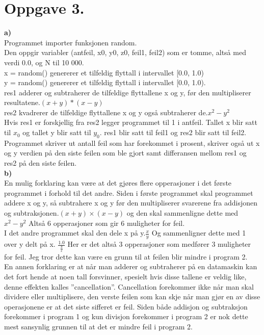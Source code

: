 \documentclass[,norsk]{article}
\begin{document}
\section{Oppgave 3.}
\textbf{a)}\\

Programmet importer funksjonen random.\\
Den oppgir variabler (antfeil, x0, y0, z0, feil1, feil2) som er tomme, altså med verdi 0.0, og N til 10 000.\\
x = random() genererer et tilfeldig flyttall i intervallet [0.0, 1.0)\\
y = random() genererer et tilfeldig flyttall i intervallet [0.0, 1.0). \\
res1 adderer og subtraherer de tilfeldige flyttallene x og y, før den
multipliserer resultatene.$(x + y)*(x - y)$\\
res2 kvadrerer de tilfeldige flyttallene x og y også subtraherer
de.$x^2 - y^2$\\
Hvis res1 er forskjellig fra res2 legger programmet til 1 i
antfeil. Tallet x blir satt til $x_0$ og tallet y blir satt
til $y_0$. res1 blir satt til feil1 og res2 blir satt til feil2.
Programmet skriver ut antall feil som har forekommet i prosent,
skriver også ut x og y verdien på den siste feilen som ble gjort samt differansen mellom
res1 og res2 på den siste feilen.\\
\textbf{b)}\\ 
En mulig forklaring kan være at det gjøres flere opperasjoner i det
første programmet i forhold til det andre.
Siden i første programmet skal programmet addere x og y, så subtrahere x
og y før den multipliserer svarerene fra addisjonen og
subtraksjonen.$(x + y)\times(x -y)$ og den skal sammenligne dette med
$x^2 - y^2$ Altså 6 opperasjoner som gir 6 muligheter for feil. \\
I det andre programmet skal den dele x på y.$\frac{x}{y}$ Og sammenligner dette
med 1 over y delt på x. $\frac{1.0}{\frac{y}{x}}$ Her er det altså 3
opperasjoner som medfører 3 muligheter for feil.  Jeg tror dette kan
være en grunn til at feilen blir mindre i program 2.\\
En annen forklaring er at når man adderer og subtraherer på en
datamaskin kan det fort hende at noen tall forsvinner, spesielt hvis
disse tallene er veldig like, denne effekten kalles
''cancellation''. Cancellation forekommer ikke når man skal dividere
eller multiplisere, den verste feilen som kan skje når man gjør en av disse
operasjonene er at det siste sifferet er feil. Siden både addisjon og
subtraksjon forekommer i program 1 og kun divisjon forekommer i
program 2 er nok dette mest sansynlig grunnen til at det er mindre
feil i program 2.
\end{document}

